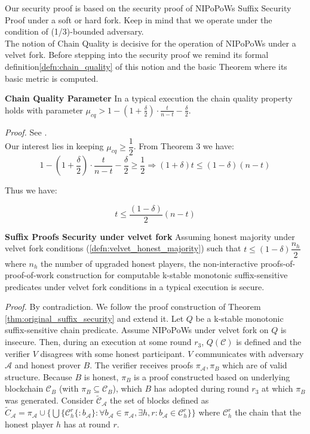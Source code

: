 Our security proof is based on the security proof of NIPoPoWs Suffix Security Proof
under a soft or hard fork. Keep in mind that we operate under the condition of
(1/3)-bounded adversary.\\

The notion of Chain Quality is decisive for the operation of NIPoPoWs under a
velvet fork. Before stepping into the security proof we remind its formal
definition\ref{defn:chain_quality} of this notion and the basic Theorem where its basic metric is computed.\\


\begin{thm}{\textbf{Chain Quality Parameter}}
	In a typical execution the chain quality property holds with parameter $\mu_{cq} > 1 - (1 + \frac{\delta}{2}) \cdot \frac{t}{n-t} - \frac{\delta}{2}$.
\end{thm}
\textit{Proof.} See \cite{Backbone}.\\

Our interest lies in keeping $\mu_{cq} \geq \dfrac{1}{2}$.
From Theorem 3 we have:
\begin{equation*}
	1 - (1 + \frac{\delta}{2}) \cdot \frac{t}{n-t} - \frac{\delta}{2} \geq \dfrac{1}{2} \Rightarrow 
	(1 + \delta)t \leq (1-\delta)(n-t)
\end{equation*}

Thus we have:
\begin{center}
\begin{equation}
	t \leq \dfrac{(1-\delta)}{2}(n - t)
\end{equation}
\end{center}

\begin{thm}{\textbf{Suffix Proofs Security under velvet fork}}
	Assuming honest majority under velvet fork conditions (\ref{defn:velvet_honest_majority}) such that $t \leq (1 - \delta) \dfrac{n_h}{2}$ where $n_h$ the number of upgraded honest players, the non-interactive proofs-of-proof-of-work construction for computable k-stable monotonic suffix-sensitive predicates under velvet fork conditions in a typical execution is secure.
\end{thm}
\textit{Proof.} By contradiction. We follow the proof construction of Theorem \ref{thm:original_suffix_security} 
and extend it. Let $Q$ be a k-stable monotonic suffix-sensitive chain
predicate. Assume NIPoPoWs under velvet fork on $Q$ is insecure. Then, during
an execution at some round  $r_3$, $Q(\mathcal{C})$ is defined and the verifier $V$
disagrees with some honest participant. $V$
communicates with adversary $\mathcal{A}$ and honest prover $B$. The verifier receives
proofs $\pi_\mathcal{A}, \pi_B$ which are of valid structure. Because $B$ is honest, $\pi_B$ is a proof constructed
based on underlying blockchain $\mathcal{C}_B$ (with $\pi_B \subseteq \mathcal{C}_B$), which $B$
has adopted during round $r_3$ at which $\pi_B$ was generated. Consider
$\widetilde{\mathcal{C}}_\mathcal{A}$ the set of blocks defined as
$\widetilde{C}_\mathcal{A} = \pi_\mathcal{A} \cup \{ \bigcup \{\mathcal{C}_h^r\{:b_\mathcal{A}\}:  \forall b_\mathcal{A} \in \pi_\mathcal{A}, \exists h,r : b_\mathcal{A} \in 
\mathcal{C}_{h}^{r}\}  \}$ where $\mathcal{C}_h^r$ the chain 
 that the honest player $h$ has at round $r$.

